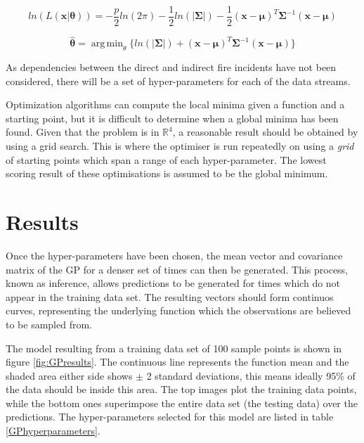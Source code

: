 \documentclass[a4paper,11pt]{report}
\DeclareMathOperator*{\argmin}{arg\,min}
\begin{document}
\singlespacing

\begin{equation} \label{eq:GPloglikelihood}
ln(L(\mathbf{x} | \boldsymbol{\theta})) = - \frac{p}{2} ln(2\pi) - \frac{1}{2} ln(|\boldsymbol{\Sigma}|) - \frac{1}{2} (\mathbf{x}-\boldsymbol{\mu})^{T} \boldsymbol{\Sigma}^{-1}(\mathbf{x}-\boldsymbol{\mu})
\end{equation}

\begin{equation} \label{eq:GPfmin}
\hat{\boldsymbol{\theta}} = \argmin_\theta{\{ln(|\boldsymbol{\Sigma}|) +(\mathbf{x}-\boldsymbol{\mu})^{T}\boldsymbol{\Sigma}^{-1}(\mathbf{x}-\boldsymbol{\mu})}\}
\end{equation}

\doublespacing

As dependencies between the direct and indirect fire incidents have not been considered, there will be a set of hyper-parameters for each of the data streams. \par

Optimization algorithms can compute the local minima given a function and a starting point, but it is difficult to determine when a global minima has been found. Given that the problem is in \(\mathds{R}^4\), a reasonable result should be obtained by using a grid search. This is where the optimiser is run repeatedly on using a \textit{grid} of starting points which span a range of each hyper-parameter. The lowest scoring result of these optimisations is assumed to be the global minimum. \par

\section{Results}

Once the hyper-parameters have been chosen, the mean vector and covariance matrix of the GP for a denser set of times can then be generated. This process, known as inference, allows predictions to be generated for times which do not appear in the training data set. The resulting vectors should form continuos curves, representing the underlying function which the observations are believed to be sampled from. \par

The model resulting from a training data set of 100 sample points is shown in figure \ref{fig:GPresults}. The continuous line represents the function mean and the shaded area either side shows \(\pm\) 2 standard deviations, this means ideally 95\% of the data should be inside this area. The top images plot the training data points, while the bottom ones superimpose the entire data set (the testing data) over the predictions. The hyper-parameters selected for this model are listed in table \ref{GPhyperparameters}.
\end{document}
